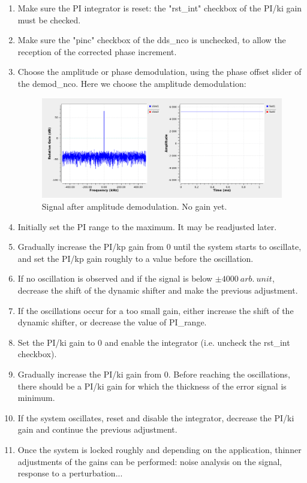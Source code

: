 \documentclass[12pt,oneside]{article}
\begin{document}
\vspace{0.3cm}
\begin{enumerate}
	\setlength\itemsep{-0.1cm}
	\item Make sure the PI integrator is reset: the "rst\_int" checkbox of the PI/ki gain must be checked.
	\item Make sure the "pinc" checkbox of the dds\_nco is unchecked, to allow the reception of the corrected phase increment.
	\item Choose the amplitude or phase demodulation, using the phase offset slider of the demod\_nco. Here we choose the amplitude demodulation:
	
\begin{figure}[h!tb]
	\begin{center}
		\vspace{0.5cm}
		\includegraphics[width=13cm,trim={0cm 0cm 0cm 0cm}, clip]{figures/1ampdemod.png}
		\caption{Signal after amplitude demodulation. No gain yet.}
		\label{fig:1ampdemod.png}
	\end{center}
\end{figure}	
	
	\item Initially set the PI range to the maximum. It may be readjusted later.
	\item Gradually increase the PI/kp gain from $0$ until the system starts to oscillate, and set the PI/kp gain roughly to a value before the oscillation.
	\item If no oscillation is observed and if the signal is below $\pm 4000~arb.~unit$, decrease the shift of the dynamic shifter and make the previous adjustment.
	\item If the oscillations occur for a too small gain, either increase the shift of the dynamic shifter, or decrease the value of PI\_range.
	\item Set the PI/ki gain to $0$ and enable the integrator (i.e. uncheck the rst\_int checkbox).
	\item Gradually increase the PI/ki gain from $0$. Before reaching the oscillations, there should be a PI/ki gain for which the thickness of the error signal is minimum. 
	\item If the system oscillates, reset and disable the integrator, decrease the PI/ki gain and continue the previous adjustment. 
	\item Once the system is locked roughly and depending on the application, thinner adjustments of the gains can be performed: noise analysis on the signal, response to a perturbation... 
\end{enumerate}
\vspace{0.3cm}
\end{document}
